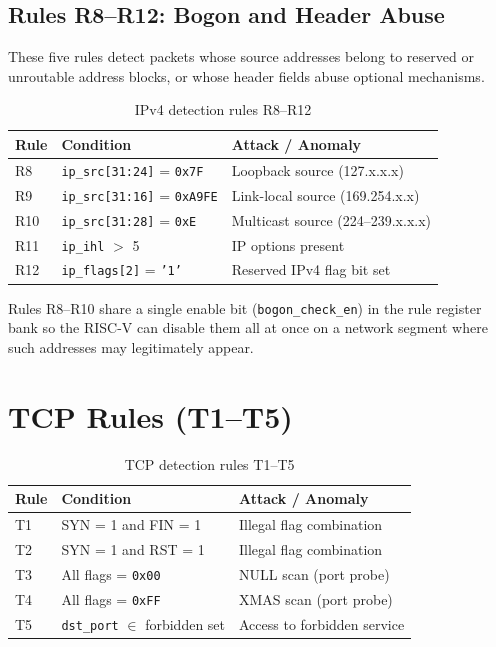\documentclass[12pt, a4paper]{report}
\begin{document}
\subsection{Rules R8--R12: Bogon and Header Abuse}

These five rules detect packets whose source addresses belong to reserved or unroutable address blocks, or whose header fields abuse optional mechanisms.

\begin{table}[H]
\centering
\caption{IPv4 detection rules R8--R12}
\label{tab:r8r12}
\begin{tabular}{lll}
\toprule
\textbf{Rule} & \textbf{Condition} & \textbf{Attack / Anomaly} \\
\midrule
R8  & \texttt{ip\_src[31:24]} = \texttt{0x7F}          & Loopback source (127.x.x.x)        \\
R9  & \texttt{ip\_src[31:16]} = \texttt{0xA9FE}        & Link-local source (169.254.x.x)    \\
R10 & \texttt{ip\_src[31:28]} = \texttt{0xE}           & Multicast source (224--239.x.x.x) \\
R11 & \texttt{ip\_ihl} $>$ 5                           & IP options present                  \\
R12 & \texttt{ip\_flags[2]} = \texttt{'1'}             & Reserved IPv4 flag bit set          \\
\bottomrule
\end{tabular}
\end{table}

Rules R8--R10 share a single enable bit (\texttt{bogon\_check\_en}) in the rule register bank so the RISC-V can disable them all at once on a network segment where such addresses may legitimately appear.

\section{TCP Rules (T1--T5)}

\begin{table}[H]
\centering
\caption{TCP detection rules T1--T5}
\label{tab:t1t5}
\begin{tabular}{lll}
\toprule
\textbf{Rule} & \textbf{Condition} & \textbf{Attack / Anomaly} \\
\midrule
T1 & SYN = 1 and FIN = 1                    & Illegal flag combination    \\
T2 & SYN = 1 and RST = 1                    & Illegal flag combination    \\
T3 & All flags = \texttt{0x00}              & NULL scan (port probe)      \\
T4 & All flags = \texttt{0xFF}              & XMAS scan (port probe)      \\
T5 & \texttt{dst\_port} $\in$ forbidden set & Access to forbidden service \\
\bottomrule
\end{tabular}
\end{table}
\end{document}
